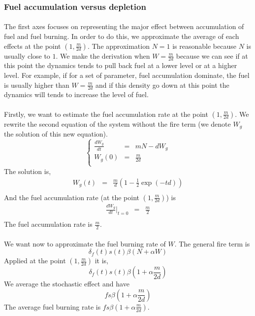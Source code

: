\documentclass{article}
\begin{document}
\subsubsection{Fuel accumulation versus depletion}

\paragraph{}
The first axes focuses on representing the major effect between accumulation of fuel and fuel burning. In order to do this, we approximate the average of each effects at the point $(1, \frac{m}{2d})$. The approximation $N=1$ is reasonable because $N$ is usually close to $1$. We make the derivation when $W = \frac{m}{2d}$ because we can see if at this point the dynamics tends to pull back fuel at a lower level or at a higher level. For example, if for a set of parameter, fuel accumulation dominate, the fuel is usually higher than $W = \frac{m}{2d}$ and if this density go down at this point the dynamics will tends to increase the level of fuel.

\paragraph{}
Firstly, we want to estimate the fuel accumulation rate at the point $(1, \frac{m}{2d})$. We rewrite the second equation of the system without the fire term (we denote $W_g$ the solution of this new equation).
\[
\left\lbrace
\begin{array}{rcl}
\frac{d W_g}{dt} & = & mN-dW_g \\
W_g(0) & = & \frac{m}{2d} \\
\end{array}
\right.
\]
The solution is,
\[
\begin{array}{rcl}
W_g(t) & = & \frac{m}{d}(1-\frac{1}{2}\exp(-td)) \\
\end{array}
\]
And the fuel accumulation rate (at the point $(1, \frac{m}{2d})$) is 
\[
\begin{array}{rcl}
\frac{dW_g}{dt}|_{t=0} & = & \frac{m}{2} \\
\end{array}
\]
The fuel accumulation rate is $\frac{m}{2}$.


\paragraph{}
We want now to approximate the fuel burning rate of $W$. The general fire term is 
\[
\delta_f(t)s(t)\beta(N+\alpha W)
\]
Applied at the point $(1, \frac{m}{2d})$ it is,
\[
\delta_f(t)s(t)\beta(1+\alpha\frac{m}{2d})
\]
We average the stochastic effect and have
\[
fs\beta(1+\alpha\frac{m}{2d})
\]
The average fuel burning rate is $fs\beta(1+\alpha\frac{m}{2d})$.
\end{document}
